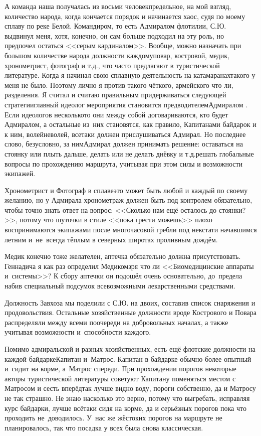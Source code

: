 А команда наша получалась из восьми человек\mdash предельное, на мой взгляд, количество народа, когда кончается порядок и начинается хаос, судя по моему сплаву по реке Белой. Командиром, то есть Адмиралом флотилии, С.Ю. выдвинул меня, хотя, конечно, он сам больше подходил на эту роль, но предпочел остаться <<серым кардиналом>>. Вообще, можно назначать при большом количестве народа должности каждому\mdash повар, костровой, медик, хронометрист, фотограф и т.д., что часто предлагают в туристической литературе. Когда я начинал свою сплавную деятельность на катамаранах\mdash такого у меня не было. Поэтому лично я против такого чёткого, армейского что ли, разделения. Я считал и считаю правильным придерживаться следующей стратегии\mdash главный идеолог мероприятия становится предводителем\mdash Адмиралом \cite{Квадригин}. Если идеологов несколько\mdash то они между собой договариваются, кто будет Адмиралом, а остальные из~них становятся, как правило, Капитанами байдарок и к ним, волей\sdash неволей, все\sdash таки должен прислушиваться Адмирал. Но последнее слово, безусловно, за ним\mdash Адмирал должен принимать решение: оставаться на стоянку или плыть дальше, делать или не делать днёвку и т.д.\mdash решать глобальные вопросы по прохождению маршрута, учитывая при этом силы и возможности экипажей.

Хронометрист и Фотограф в сплаве\mdash это может быть любой и каждый по своему желанию, но у Адмирала хронометраж должен быть под контролем обязательно, чтобы точно знать ответ на вопрос: <<Сколько нам ещё осталось до стоянки?>>, потому что шуточки в стиле <<пока грести можешь>> плохо воспринимаются экипажами после многочасовой гребли под некстати начавшимся летним и~не~всегда тёплым в северных широтах проливным дождём. 

Медик конечно тоже желателен, аптечка обязательно должна присутствовать. Геннадича я как раз определил Медиком\mdash зря что ли <<Биомедицинские аппараты и~системы>>? К сбору аптечки он подошёл очень основательно, до~предела набив специальный подсумок всевозможными лекарственными средствами.

Должность Завхоза мы поделили с С.Ю. на двоих, составив список снаряжения и продовольствия. Остальные хозяйственные должности вроде Кострового и Повара распределяли между всеми по\sdash очереди на добровольных началах, а также учитывая возможности и~способности каждого. 

Помимо адмиральской и разных хозяйственных, есть ещё флотские должности на каждой байдарке\mdash Капитан и~Матрос. Капитан в байдарке обычно более опытный и~сидит на корме, а~Матрос спереди. При прохождении порогов некоторые авторы туристической литературы советуют Капитану поменяться местом с Матросом и сесть вперёд\mdash так лучше видно воду, пороги собственно, да и Матросу не так страшно. Не знаю насколько это верно, потому что выгребать, исправляя курс байдарки, лучше всё\sdash таки сидя на корме, да и серьёзных порогов пока что проходить не~доводилось. У~нас же жёстоких порогов на маршруте не планировалось, так что посадка у всех была снова классическая. 

